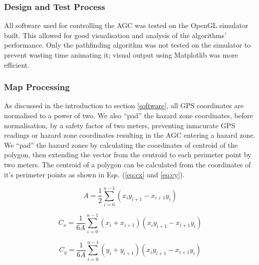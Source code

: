 \documentclass[11pt,landscape]{article}
\begin{document}
\begin{multicols}{3}
\subsubsection{Design and Test Process}
All software used for controlling the AGC was tested on the OpenGL simulator
built. This allowed for good visualisation and analysis of the algorithms'
performance. Only the pathfinding algorithm was not tested on the simulator to
prevent wasting time animating it; visual output using Matplotlib was more
efficient.

\subsubsection{Map Processing}
As discussed in the introduction to section \ref{software}, all GPS coordinates
are normalised to a power of two. We also ``pad'' the hazard zone coordinates,
before normalisation, by a safety factor of two meters, preventing innacurate
GPS readings or hazard zone coordinates resulting in the AGC entering a hazard
zone. We ``pad'' the hazard zones by calculating the coordinates of centroid of
the polygon, then extending the vector from the centroid to each perimeter point
by two meters. The centroid of a polygon can be calculated from the coordinates
of it's perimeter points as shown in Eqs. (\ref{eq:cx} and \ref{eq:cy}).
\begin{center}
    \begin{equation*}
        A=\frac{1}{2}\sum_{i=0}^{n-1}\left( x_i y_{i+1} - x_{i+1} y_i\right)
    \end{equation*}
\end{center}
\begin{center}
    \begin{equation}
        C_x=\frac{1}{6A}\sum_{i=0}^{n-1} (x_i + x_{i+1}) (x_i y_{i+1} - x_{i+1} y_i)
        \label{eq:cx}
    \end{equation}
\end{center}
\begin{center}
    \begin{equation}
        C_y=\frac{1}{6A}\sum_{i=0}^{n-1} (y_i + y_{i+1}) (x_i y_{i+1} - x_{i+1} y_i)
        \label{eq:cy}
    \end{equation}
\end{center}

\end{multicols}
\end{document}
